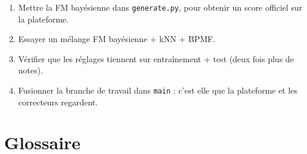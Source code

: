 \documentclass[11pt,a4paper]{article}
\begin{document}
\begin{enumerate}
  \item Mettre la FM bayésienne dans \texttt{generate.py}, pour obtenir un score officiel
        sur la plateforme.
  \item Essayer un mélange FM bayésienne + kNN + BPMF.
  \item Vérifier que les réglages tiennent sur entraînement + test (deux fois plus de notes).
  \item Fusionner la branche de travail dans \texttt{main} : c'est elle que la plateforme
        et les correcteurs regardent.
\end{enumerate}

\section{Glossaire}
\end{document}
